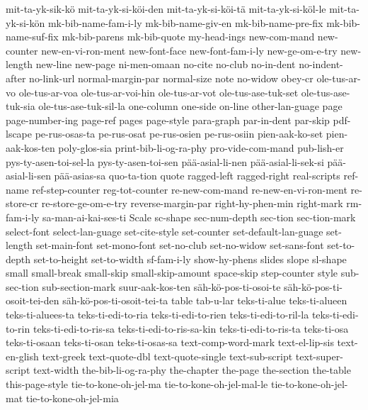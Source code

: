 {  mit-ta-yk-sik-kö
  mit-ta-yk-si-köi-den
  mit-ta-yk-si-köi-tä
  mit-ta-yk-si-köl-le
  mit-ta-yk-si-kön
  mk-bib-name-fam-i-ly
  mk-bib-name-giv-en
  mk-bib-name-pre-fix
  mk-bib-name-suf-fix
  mk-bib-parens
  mk-bib-quote
  my-head-ings
  new-com-mand
  new-counter
  new-en-vi-ron-ment
  new-font-face
  new-font-fam-i-ly
  new-ge-om-e-try
  new-length
  new-line
  new-page
  ni-men-omaan
  no-cite
  no-club
  no-in-dent
  no-indent-after
  no-link-url
  normal-margin-par
  normal-size
  note
  no-widow
  obey-cr
  ole-tus-ar-vo
  ole-tus-ar-voa
  ole-tus-ar-voi-hin
  ole-tus-ar-vot
  ole-tus-ase-tuk-set
  ole-tus-ase-tuk-sia
  ole-tus-ase-tuk-sil-la
  one-column
  one-side
  on-line
  other-lan-guage
  page
  page-number-ing
  page-ref
  pages
  page-style
  para-graph
  par-in-dent
  par-skip
  pdf-lscape
  pe-rus-osas-ta
  pe-rus-osat
  pe-rus-osien
  pe-rus-osiin
  pien-aak-ko-set
  pien-aak-kos-ten
  poly-glos-sia
  print-bib-li-og-ra-phy
  pro-vide-com-mand
  pub-lish-er
  pys-ty-asen-toi-sel-la
  pys-ty-asen-toi-sen
  pää-asial-li-nen
  pää-asial-li-sek-si
  pää-asial-li-sen
  pää-asias-sa
  quo-ta-tion
  quote
  ragged-left
  ragged-right
  real-scripts
  ref-name
  ref-step-counter
  reg-tot-counter
  re-new-com-mand
  re-new-en-vi-ron-ment
  re-store-cr
  re-store-ge-om-e-try
  reverse-margin-par
  right-hy-phen-min
  right-mark
  rm-fam-i-ly
  sa-man-ai-kai-ses-ti
  Scale
  sc-shape
  sec-num-depth
  sec-tion
  sec-tion-mark
  select-font
  select-lan-guage
  set-cite-style
  set-counter
  set-default-lan-guage
  set-length
  set-main-font
  set-mono-font
  set-no-club
  set-no-widow
  set-sans-font
  set-to-depth
  set-to-height
  set-to-width
  sf-fam-i-ly
  show-hy-phens
  slides
  slope
  sl-shape
  small
  small-break
  small-skip
  small-skip-amount
  space-skip
  step-counter
  style
  sub-sec-tion
  sub-section-mark
  suur-aak-kos-ten
  säh-kö-pos-ti-osoi-te
  säh-kö-pos-ti-osoit-tei-den
  säh-kö-pos-ti-osoit-tei-ta
  table
  tab-u-lar
  teks-ti-alue
  teks-ti-alueen
  teks-ti-aluees-ta
  teks-ti-edi-to-ria
  teks-ti-edi-to-rien
  teks-ti-edi-to-ril-la
  teks-ti-edi-to-rin
  teks-ti-edi-to-ris-sa
  teks-ti-edi-to-ris-sa-kin
  teks-ti-edi-to-ris-ta
  teks-ti-osa
  teks-ti-osaan
  teks-ti-osan
  teks-ti-osas-sa
  text-comp-word-mark
  text-el-lip-sis
  text-en-glish
  text-greek
  text-quote-dbl
  text-quote-single
  text-sub-script
  text-super-script
  text-width
  the-bib-li-og-ra-phy
  the-chapter
  the-page
  the-section
  the-table
  this-page-style
  tie-to-kone-oh-jel-ma
  tie-to-kone-oh-jel-mal-le
  tie-to-kone-oh-jel-mat
  tie-to-kone-oh-jel-mia
}
